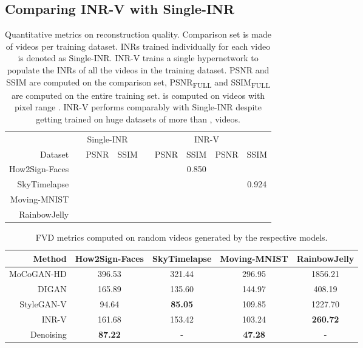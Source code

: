 \documentclass[10pt]{article} \usepackage[accepted]{tmlr}
\begin{document}
\subsection{Comparing INR-V with Single-INR}
\begin{table}
\begin{adjustbox}{max width=\textwidth}
\begin{tabular}{r|ccc|ccc|cc}
   \toprule
   & \multicolumn{3}{c|}{Single-INR} & \multicolumn{5}{c}{INR-V} \\
   Dataset &    & PSNR  & SSIM  &    & PSNR  & SSIM  & PSNR  & SSIM  \\
   \midrule
   How2Sign-Faces &  &  &  &  &  & 0.850 &  &  \\ 
   SkyTimelapse &  &  &  &  &  &  &  & 0.924 \\
   Moving-MNIST &  &  &  &  &  &  &  &  \\
   RainbowJelly &  &  &  &  &  &  &  & \\
   \bottomrule
\end{tabular}\end{adjustbox}
  \caption{\small Quantitative metrics on reconstruction quality. Comparison set is made of  videos per training dataset. INRs trained individually for each video is denoted as Single-INR. INR-V trains a single hypernetwork  to populate the INRs of all the videos in the training dataset. PSNR and SSIM are computed on the comparison set, PSNR\textsubscript{FULL} and SSIM\textsubscript{FULL} are computed on the entire training set.  is computed on videos with pixel range . INR-V performs comparably with Single-INR despite getting trained on huge datasets of more than , videos.}
  \label{tab:inrvsinrv}
\end{table}

\begingroup
\label{tab:metrics}
\begin{table*}[t]
\centering
\begin{tabularx}{0.83\textwidth}{r|cccc}
  \toprule
    Method & How2Sign-Faces & SkyTimelapse & Moving-MNIST & RainbowJelly \\
    \midrule
    MoCoGAN-HD & 396.53 & 321.44 & 296.95 & 1856.21 
    \\
    DIGAN & 165.89 & 135.60 & 144.97 & 408.19
    \\
    StyleGAN-V & 94.64 & \textbf{85.05} & 109.85 & 1227.70
    \\
    \midrule
    INR-V & 161.68 & 153.42 & 103.24 & \textbf{260.72} 
    \\
     Denoising & \textbf{87.22} & - & \textbf{47.28} & -
    \\
    \bottomrule
  \end{tabularx}
  \caption{ FVD metrics computed on random videos generated by the respective models. }
  \label{tab:main_results}
\end{table*}
\endgroup
\end{document}
